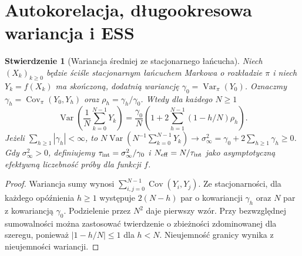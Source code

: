 \documentclass[11pt,a4paper,oneside]{report}
\numberwithin{equation}{chapter}
\theoremstyle{plain}
\newtheorem{stwierdzenie}[twierdzenie]{Stwierdzenie}
\theoremstyle{definition}
\theoremstyle{remark}
\newcommand{\Var}{\operatorname{Var}}
\newcommand{\Cov}{\operatorname{Cov}}
\begin{document}
\section{Autokorelacja, długookresowa wariancja i ESS}
\begin{stwierdzenie}[Wariancja średniej ze stacjonarnego łańcucha]
\label{prop:mcmc-autocorrelation}
Niech $(X_k)_{k\ge0}$ będzie ściśle stacjonarnym
łańcuchem Markowa o rozkładzie $\pi$ i niech
$Y_k=f(X_k)$ ma skończoną, dodatnią wariancję
$\gamma_0=\Var_\pi(Y_0)$. Oznaczmy
$\gamma_h=\Cov_\pi(Y_0,Y_h)$ oraz
$\rho_h=\gamma_h/\gamma_0$. Wtedy dla każdego $N\ge1$
\[
 \Var\left(\frac1N\sum_{k=0}^{N-1}Y_k\right)
 =\frac{\gamma_0}{N}\left(1+2\sum_{h=1}^{N-1}
 (1-h/N)\rho_h\right).
\]
Jeżeli $\sum_{h\ge1}|\gamma_h|<\infty$, to
$N\Var(N^{-1}\sum_{k=0}^{N-1}Y_k)\to
\sigma_\infty^2=\gamma_0+2\sum_{h\ge1}\gamma_h\ge0$.
Gdy $\sigma_\infty^2>0$, definiujemy
$\tau_{\rm int}=\sigma_\infty^2/\gamma_0$ i
$N_{\rm eff}=N/\tau_{\rm int}$ jako asymptotyczną
\emph{efektywną liczebność próby dla funkcji $f$}.
\end{stwierdzenie}
\begin{proof}
Wariancja sumy wynosi
$\sum_{i,j=0}^{N-1}\Cov(Y_i,Y_j)$.
Ze stacjonarności, dla każdego opóźnienia $h\ge1$
występuje $2(N-h)$ par o kowariancji $\gamma_h$
oraz $N$ par z kowariancją $\gamma_0$.
Podzielenie przez $N^2$ daje pierwszy wzór.
Przy bezwzględnej sumowalności można zastosować
twierdzenie o zbieżności zdominowanej dla szeregu,
ponieważ $|1-h/N|\le1$ dla $h<N$.
Nieujemność granicy wynika z nieujemności wariancji.
\end{proof}
\end{document}
